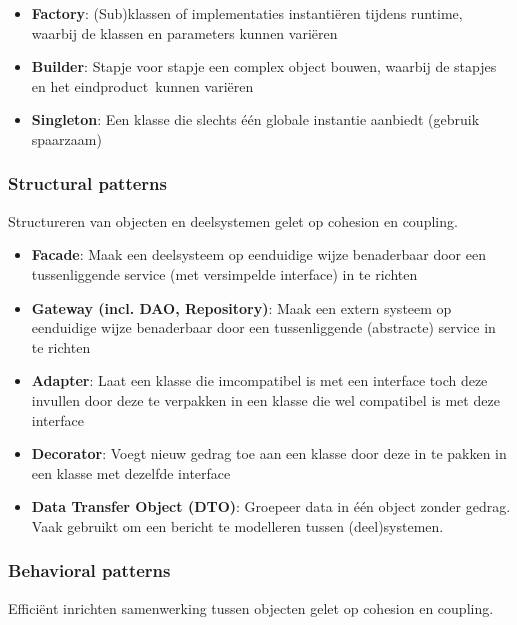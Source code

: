 \begin{itemize}
    \item \textbf{Factory}: 
    (Sub)klassen of implementaties instantiëren tijdens runtime,
     waarbij de klassen en parameters kunnen variëren
    \item \textbf{Builder}: 
    Stapje voor stapje een complex object bouwen, 
    waarbij de stapjes en het eindproduct kunnen variëren
    \item \textbf{Singleton}:
    Een klasse die slechts één globale instantie aanbiedt 
    (gebruik spaarzaam)
\end{itemize}

\subsubsection{Structural patterns}
Structureren van objecten en deelsystemen
gelet op cohesion en coupling.

\begin{itemize}
    \item \textbf{Facade}:
    Maak een deelsysteem op eenduidige wijze 
    benaderbaar door een tussenliggende service 
    (met versimpelde interface) in te richten
    \item \textbf{Gateway (incl. DAO, Repository)}:
    Maak een extern systeem op eenduidige wijze 
    benaderbaar door een tussenliggende 
    (abstracte) service in te richten
    \item \textbf{Adapter}:
    Laat een klasse die imcompatibel is met 
    een interface toch deze invullen 
    door deze te verpakken in een klasse 
    die wel compatibel is met deze interface
    \item \textbf{Decorator}:
    Voegt nieuw gedrag toe aan een klasse 
    door deze in te pakken in een klasse 
    met dezelfde interface
    \item \textbf{Data Transfer Object (DTO)}:
    Groepeer data in één object zonder gedrag. 
    Vaak gebruikt om een bericht te modelleren
    tussen (deel)systemen.

\end{itemize}

\subsubsection{Behavioral patterns}
Efficiënt inrichten samenwerking tussen objecten
gelet op cohesion en coupling.

